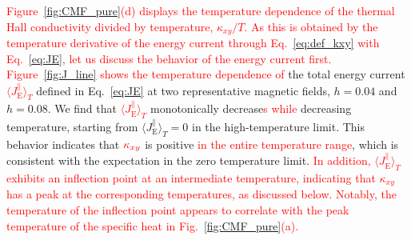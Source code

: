 \documentclass[twocolumn,superscriptaddress,showpacs, longbibliography, aps, prb]{revtex4-2}
\newcommand{\red}[1]{\textcolor{red}{#1}}
\newcommand{\orange}[1]{\textcolor{orange}{#1}}
\begin{document}
\red{Figure~\ref{fig:CMF_pure}(d) displays the temperature dependence of the thermal Hall conductivity divided by temperature, $\kappa_{xy}/T$. 
As this is obtained by the temperature derivative of the energy current through Eq.~\eqref{eq:def_kxy} with Eq.~\eqref{eq:JE}, let us discuss the behavior of the energy current first. 
Figure~\ref{fig:J_line} shows the temperature dependence of} the total energy current \red{$\langle J_{\mathrm{E}}^\parallel \rangle_T$} defined in Eq.~\eqref{eq:JE} 
at two representative magnetic fields, $h=0.04$ and $h=0.08$. 
We find that %
\red{$\langle J_{\mathrm{E}}^\parallel \rangle_T$} monotonically decrease\red{s} 
\red{while} decreasing temperature, starting from $\langle J_{\mathrm{E}}^{\parallel} \rangle_T %
=0$ in the high-temperature limit. This behavior indicates that $\red{\kappa_{xy}}%
$ 
is positive \red{in the entire temperature range}, %
which is consistent with the expectation %
in the zero temperature limit. 
\red{In addition, $\langle J_{\mathrm{E}}^\parallel \rangle_T$ exhibits an inflection point at an intermediate temperature, indicating that $\kappa_{xy}$ has a peak at the corresponding temperatures, as discussed below. 
Notably, the temperature of the inflection point appears to correlate with the peak temperature of the specific heat in Fig.~\ref{fig:CMF_pure}(a).} 
\end{document}
